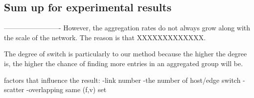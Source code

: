 \subsection{Sum up for experimental results}
-------------------------
However, the aggregation rates do not always grow along with the scale of the network. The reason is that XXXXXXXXXXXXX.


The degree of switch is particularly to our method because the higher the degree is, the higher the chance of finding more entries in an aggregated group will be.


factors that influence the result:
	-link number
	-the number of host/edge switch
	-scatter 
	-overlapping same (f,v) set

